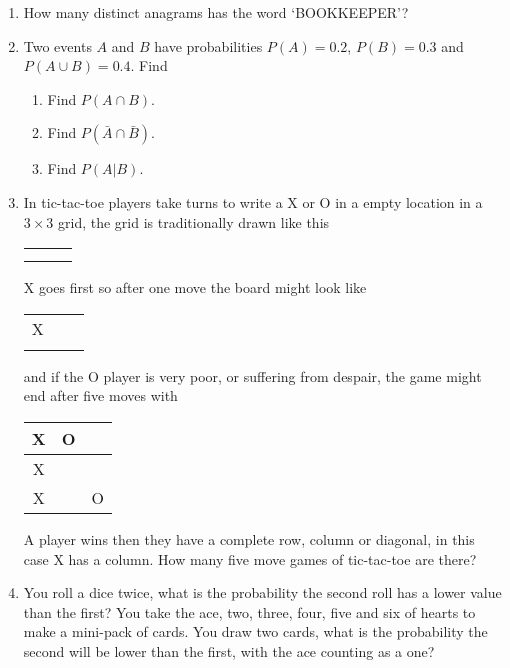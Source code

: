 \documentclass[11pt,a4paper]{scrartcl}
\begin{document}
\begin{enumerate}

\item How many distinct anagrams has the word `BOOKKEEPER'?

\item Two events $A$ and $B$ have probabilities $P(A)=0.2$, $P(B)=0.3$ and $P(A\cup B)=0.4$. Find
\begin{enumerate}
\item Find $P(A\cap B)$.
\item Find $P(\bar{A}\cap \bar{B})$.
\item Find $P(A|B)$.
\end{enumerate}

\item In tic-tac-toe players take turns to write a X or O in a empty location in a $3\times 3$ grid, the grid is traditionally drawn like this
  {\Huge
\begin{center}
\begin{tabular}{c|c|c}
 \phantom{X}&\phantom{O}  &\phantom{O}  \\ \hline
 &\phantom{X}  & \phantom{X}\\ \hline
 &  &\phantom{O}
\end{tabular}
\end{center}
}
  X goes first so after one move the board might look like
  {\Huge
\begin{center}
  \begin{tabular}{c|c|c}
     \phantom{X}&\phantom{O}  &\phantom{O}  \\ \hline
  X&  & \\ \hline
 &  &\phantom{O}
\end{tabular}
\end{center}
}
and if the O player is very poor, or suffering from despair, the game might end after five moves with
  {\Huge
\begin{center}
  \begin{tabular}{c|c|c}
     X&O  &\phantom{O}  \\ \hline
  X&  & \\ \hline
 X&  &O
\end{tabular}
\end{center}
  } A player wins then they have a complete row, column or diagonal,
  in this case X has a column.  How many five move games of
  tic-tac-toe are there?

\item You roll a dice twice, what is the probability the second roll
  has a lower value than the first? You take the ace, two, three,
  four, five and six of hearts to make a mini-pack of cards. You draw
  two cards, what is the probability the second will be lower than the
  first, with the ace counting as a one?

  
\end{enumerate}
\end{document}
